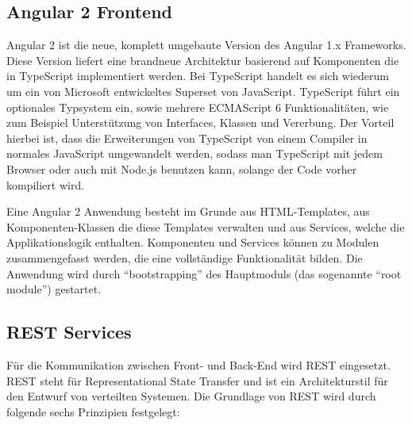 \subsection{Angular 2 Frontend}

Angular 2 ist die neue, komplett umgebaute Version des Angular 1.x Frameworks. Diese Version liefert eine brandneue Architektur basierend auf Komponenten die in TypeScript implementiert werden. Bei TypeScript handelt es sich wiederum um ein von Microsoft entwickeltes Superset von JavaScript. TypeScript führt ein optionales Typsystem ein, sowie mehrere ECMAScript 6 Funktionalitäten, wie zum Beispiel Unterstützung von Interfaces, Klassen und Vererbung. Der Vorteil hierbei ist, dass die Erweiterungen von TypeScript von einem Compiler in normales JavaScript umgewandelt werden, sodass man TypeScript mit jedem Browser oder auch mit Node.js benutzen kann, solange der Code vorher kompiliert wird\cite{Deeleman2016}. 

Eine Angular 2 Anwendung besteht im Grunde aus \acs{HTML}-Templates, aus Komponenten-Klassen die diese Templates verwalten und aus Services, welche die Applikationslogik enthalten. Komponenten und Services können zu Modulen zusammengefasst werden, die eine vollständige Funktionalität bilden. Die Anwendung wird durch \enquote{bootstrapping} des Hauptmoduls (das sogenannte \enquote{root module}) gestartet\cite{Angular.io2017}.


\subsection{REST Services}
Für die Kommunikation zwischen Front- und Back-End wird REST eingesetzt. REST steht für Representational State Transfer und ist ein Architekturstil für den Entwurf von verteilten Systemen. Die Grundlage von REST wird durch folgende sechs Prinzipien festgelegt\cite{Varanasi2015}:

